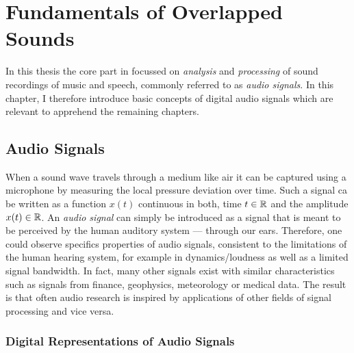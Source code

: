 \hypertarget{Fundamentals of Overlapped Sounds}{%
\chapter{Fundamentals of Overlapped Sounds}\label{cha:fundamentals}}

In this thesis the core part in focussed on \emph{analysis} and \emph{processing} of sound recordings of music and speech, commonly referred to as \emph{audio signals}.
In this chapter, I therefore introduce basic concepts of digital audio signals which are relevant to apprehend the remaining chapters.

\hypertarget{Audio Signals}{%
\section{Audio Signals}\label{sec:specifics-of-audio-signals}}

When a sound wave travels through a medium like air it can be captured using a microphone by measuring the local pressure deviation over time.
Such a signal ca be written as a function \(x(t)\) continuous in both, time \(t \in {\mathbb{R}}\) and the amplitude \(x(t) \in {\mathbb{R}}\).
An \emph{audio signal} can simply be introduced as a signal that is meant to be perceived by the human auditory system --- through our ears.
Therefore, one could observe specifics properties of audio signals, consistent to the limitations of the human hearing system, for example in dynamics/loudness as well as a limited signal bandwidth.
In fact, many other signals exist with similar characteristics such as signals from finance, geophysics, meteorology or medical data.
The result is that often audio research is inspired by applications of other fields of signal processing and vice versa.

\hypertarget{digital-representations-of-audio-signals}{%
\subsection{Digital Representations of Audio
Signals}\label{digital-representations-of-audio-signals}}

